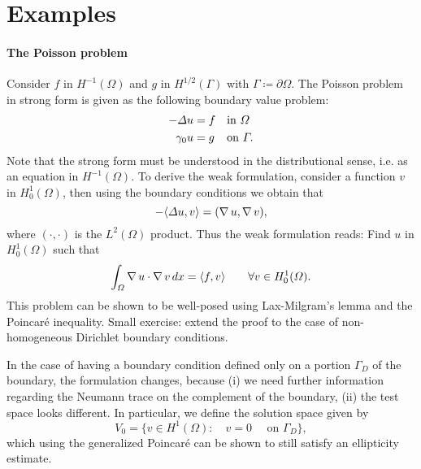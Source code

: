 \section{Examples}
\paragraph{The Poisson problem} Consider $f$ in $H^{-1}(\Omega)$ and $g$ in $H^{1/2}(\Gamma)$ with $\Gamma\coloneqq \partial\Omega$. The Poisson problem in strong form is given as the following boundary value problem: 
\begin{equation*}
    \begin{aligned}
        -\Delta u  &= f &&\text{in }\Omega\\
        \gamma_0 u &= g &&\text{on }\Gamma.
    \end{aligned}
\end{equation*}
Note that the strong form must be understood in the distributional sense, i.e. as an equation in $H^{-1}(\Omega)$. To derive the weak formulation, consider a function $v$ in $H_0^1(\Omega)$, then using the boundary conditions we obtain that 
\begin{equation}
    -\langle \Delta u,v\rangle = (\operatorname{\nabla} u, \operatorname{\nabla} v),
\end{equation}
where $(\cdot, \cdot)$ is the $L^2(\Omega)$ product. Thus the weak formulation reads: Find $u$ in $H_0^1(\Omega)$ such that 
    \begin{equation}
\int_\Omega \operatorname{\nabla} u\cdot \operatorname{\nabla} v\,dx = \langle f, v\rangle \qquad \forall v\in H_0^1(\Omega).
\end{equation}
This problem can be shown to be well-posed using Lax-Milgram's lemma and the Poincaré inequality. Small exercise: extend the proof to the case of non-homogeneous Dirichlet boundary conditions.

In the case of having a boundary condition defined only on a portion $\Gamma_D$ of the boundary, the formulation changes, because (i) we need further information regarding the Neumann trace on the complement of the boundary, (ii) the test space looks different. In particular, we define the solution space given by 
\begin{equation}\label{eq:def-V0}
    V_0 = \{v\in H^1(\Omega): \quad v = 0 \quad\text{ on $\Gamma_D$}\},
\end{equation}
which using the generalized Poincaré can be shown to still satisfy an ellipticity estimate. 

